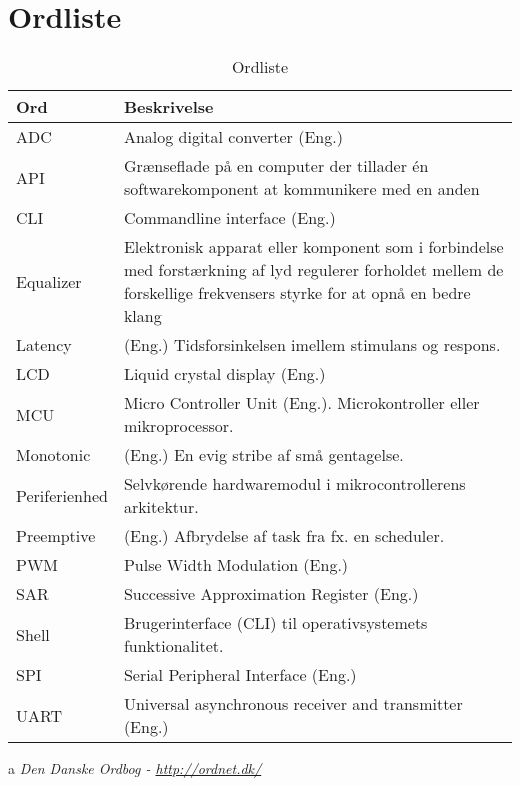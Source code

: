 \chapter{Ordliste} \label{bilag:ordliste}

\begin{table}[h!]
	\caption{Ordliste}
	\label{tab:ordliste}
	\begin{threeparttable}
		\begin{tabular}{l p{}}
			\toprule
			\textbf{Ord}      & \textbf{Beskrivelse}   \\ 
			\midrule
			ADC			& Analog digital converter (Eng.)\\
			API			& Grænseflade på en computer der tillader én softwarekomponent at kommunikere med en anden\tnote{a}\\
			CLI			& Commandline interface (Eng.)\\
			Equalizer 	& Elektronisk apparat eller komponent som i forbindelse med forstærkning af lyd regulerer forholdet mellem de forskellige frekvensers styrke for at opnå en bedre klang \tnote{a} \\
			Latency		& (Eng.) Tidsforsinkelsen imellem stimulans og respons.\\ 
			LCD			& Liquid crystal display (Eng.) \\
			MCU       	& Micro Controller Unit (Eng.). Microkontroller eller mikroprocessor. \\
			Monotonic 	& (Eng.) En evig stribe af små gentagelse.  \tnote{a}\\
			Periferienhed & Selvkørende hardwaremodul i mikrocontrollerens arkitektur.\\
			Preemptive	& (Eng.) Afbrydelse af task fra fx. en scheduler.\\
			PWM			& Pulse Width Modulation (Eng.) \\
			SAR			& Successive Approximation Register (Eng.)\\
			Shell		& Brugerinterface (CLI) til operativsystemets funktionalitet.\\
			SPI			& Serial Peripheral Interface (Eng.)  \\
			UART		& Universal asynchronous receiver and transmitter (Eng.)\\
			\bottomrule
		\end{tabular}
	
		\begin{tablenotes}
			\item[a] \textit{Den Danske Ordbog - \url{http://ordnet.dk/}}
		\end{tablenotes}
	\end{threeparttable}
\end{table}
